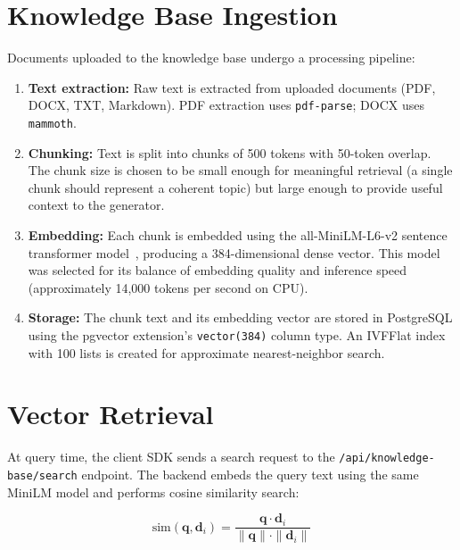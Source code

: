 \documentclass[12pt, letterpaper, twoside]{report}
\begin{document}
\section{Knowledge Base Ingestion}
\label{sec:kb_ingestion}

Documents uploaded to the knowledge base undergo a processing pipeline:

\begin{enumerate}[itemsep=3pt]
\item \textbf{Text extraction:} Raw text is extracted from uploaded documents (PDF, DOCX, TXT, Markdown). PDF extraction uses \texttt{pdf-parse}; DOCX uses \texttt{mammoth}.

\item \textbf{Chunking:} Text is split into chunks of 500 tokens with 50-token overlap. The chunk size is chosen to be small enough for meaningful retrieval (a single chunk should represent a coherent topic) but large enough to provide useful context to the generator.

\item \textbf{Embedding:} Each chunk is embedded using the all-MiniLM-L6-v2 sentence transformer model~\cite{wang2020minilm, reimers2019sentence}, producing a 384-dimensional dense vector. This model was selected for its balance of embedding quality and inference speed (approximately 14,000 tokens per second on CPU).

\item \textbf{Storage:} The chunk text and its embedding vector are stored in PostgreSQL using the pgvector extension's \texttt{vector(384)} column type. An IVFFlat index with 100 lists is created for approximate nearest-neighbor search.
\end{enumerate}

\section{Vector Retrieval}
\label{sec:vector_retrieval}

At query time, the client SDK sends a search request to the \texttt{/api/\allowbreak knowledge-base/\allowbreak search} endpoint. The backend embeds the query text using the same MiniLM model and performs cosine similarity search:

\begin{equation}
\text{sim}(\mathbf{q}, \mathbf{d}_i) = \frac{\mathbf{q} \cdot \mathbf{d}_i}{\|\mathbf{q}\| \cdot \|\mathbf{d}_i\|}
\end{equation}
\end{document}
